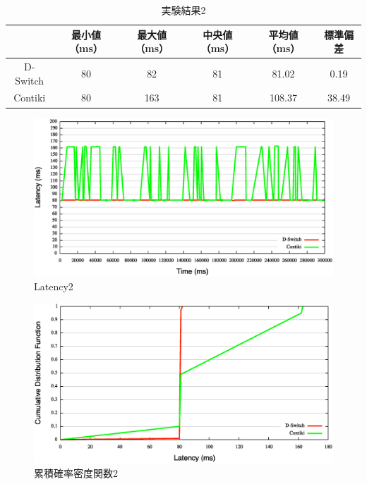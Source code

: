 \begin{table}[htbp]
  \centering
  \caption{実験結果2}
  \begin{tabular}{|c||c|c|c|c|c|} \hline
    \backslashbox{}{} & 最小値（ms） & 最大値（ms） & 中央値（ms） & 平均値（ms） & 標準偏差 \\ \hline \hline
    D-Switch & 80 & 82 & 81 & 81.02 & 0.19 \\ \hline
    Contiki & 80 & 163 & 81 & 108.37 & 38.49 \\ \hline
  \end{tabular}
  \label{tab:latency2}
\end{table}

\begin{figure}[htbp]
 \begin{center}
  \includegraphics[width=120mm]{./images/latency2.eps}
 \end{center}
 \caption{Latency2}
 \label{fig:latency2}
\end{figure}

\begin{figure}[htbp]
 \begin{center}
  \includegraphics[width=120mm]{./images/cdf2.eps}
 \end{center}
 \caption{累積確率密度関数2}
 \label{fig:cdf2}
\end{figure}


